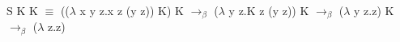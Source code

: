 \documentclass[24pt]{article}
\begin{document}
    S K K $\equiv$ (($\lambda$ x y z.x z (y z)) K) K
    $\to_\beta$ ($\lambda$ y z.K z (y z)) K $\to_\beta$
    ($\lambda$ y z.z) K $\to_\beta$ ($\lambda$ z.z)
\end{document}
